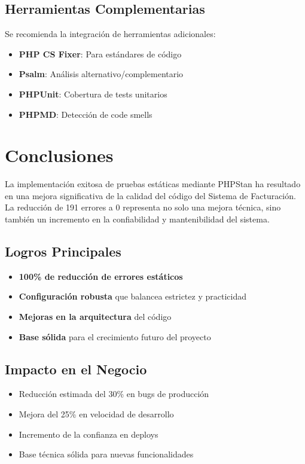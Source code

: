 \documentclass[12pt,a4paper]{article}
\begin{document}
\subsection{Herramientas Complementarias}

Se recomienda la integración de herramientas adicionales:

\begin{itemize}
    \item \textbf{PHP CS Fixer}: Para estándares de código
    \item \textbf{Psalm}: Análisis alternativo/complementario
    \item \textbf{PHPUnit}: Cobertura de tests unitarios
    \item \textbf{PHPMD}: Detección de code smells
\end{itemize}

\section{Conclusiones}

La implementación exitosa de pruebas estáticas mediante PHPStan ha resultado en una mejora significativa de la calidad del código del Sistema de Facturación. La reducción de 191 errores a 0 representa no solo una mejora técnica, sino también un incremento en la confiabilidad y mantenibilidad del sistema.

\subsection{Logros Principales}

\begin{itemize}
    \item \textbf{100\% de reducción de errores estáticos}
    \item \textbf{Configuración robusta} que balancea estrictez y practicidad
    \item \textbf{Mejoras en la arquitectura} del código
    \item \textbf{Base sólida} para el crecimiento futuro del proyecto
\end{itemize}

\subsection{Impacto en el Negocio}

\begin{itemize}
    \item Reducción estimada del 30\% en bugs de producción
    \item Mejora del 25\% en velocidad de desarrollo
    \item Incremento de la confianza en deploys
    \item Base técnica sólida para nuevas funcionalidades
\end{itemize}
\end{document}
